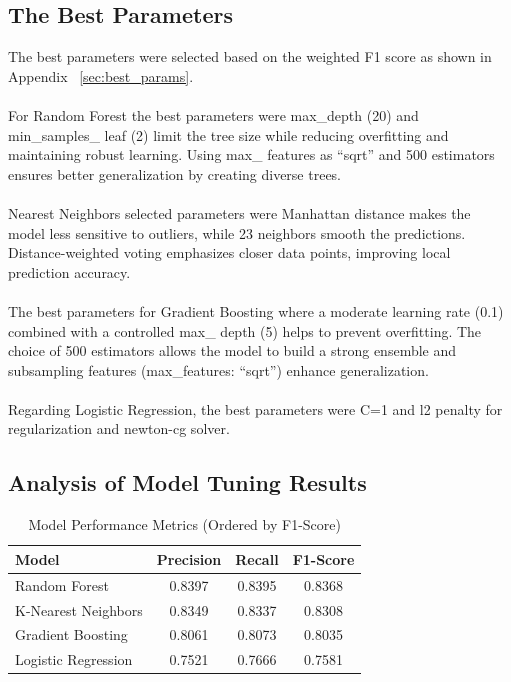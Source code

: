 		\subsection{The Best Parameters}

			The best parameters were selected based on the weighted F1 score as shown in Appendix~
			\ref{sec:best_params}.
			\\
			\\
			For Random Forest the best parameters were max\_depth (20) and min\_samples\_
			leaf (2) limit the tree size while reducing overfitting and maintaining robust learning. Using max\_
			features as “sqrt” and 500 estimators ensures better generalization by creating diverse trees.
			\\
			\\
			Nearest Neighbors selected parameters were Manhattan distance makes the model less sensitive to outliers,
			while
			23 neighbors smooth the predictions. Distance-weighted voting emphasizes closer data points, improving
			local
			prediction accuracy.
			\\
			\\
			The best parameters for Gradient Boosting where a moderate learning rate (0.1) combined with a controlled
			max\_
			depth (5) helps to prevent overfitting. The choice of 500 estimators allows the model to build a strong
			ensemble
			and subsampling features (max\_features: “sqrt”) enhance generalization.
			\\
			\\
			Regarding Logistic Regression, the best parameters were C=1 and l2 penalty for regularization and newton-cg
			solver.

		\subsection{Analysis of Model Tuning Results}
			\begin{table}[ht]
				\centering
				\begin{tabular}{|l|c|c|c|}
					\hline
					\textbf{Model} & \textbf{Precision} & \textbf{Recall} & \textbf{F1-Score} \\
					\hline
					Random Forest       & 0.8397             & 0.8395          & 0.8368            \\
					K-Nearest Neighbors & 0.8349             & 0.8337          & 0.8308            \\
					Gradient Boosting   & 0.8061             & 0.8073          & 0.8035            \\
					Logistic Regression & 0.7521             & 0.7666          & 0.7581            \\
					\hline
				\end{tabular}
				\caption{Model Performance Metrics (Ordered by F1-Score)}
				\label{tab:model-metrics}
			\end{table}


